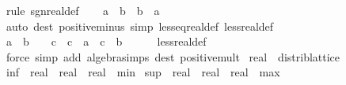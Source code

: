 \begin{isabellebody}
\ {\isacharparenleft}{\kern0pt}rule\ sgn{\isacharunderscore}{\kern0pt}real{\isacharunderscore}{\kern0pt}def{\isacharparenright}{\kern0pt}\isanewline
\ \ \isamarkupfalse%
\ {\isachardoublequoteopen}a\ {\isasymle}\ b\ {\isasymor}\ b\ {\isasymle}\ a{\isachardoublequoteclose}\isanewline
\ \ \ \ \isamarkupfalse%
\ {\isacharparenleft}{\kern0pt}auto\ dest{\isacharbang}{\kern0pt}{\isacharcolon}{\kern0pt}\ positive{\isacharunderscore}{\kern0pt}minus\ simp{\isacharcolon}{\kern0pt}\ less{\isacharunderscore}{\kern0pt}eq{\isacharunderscore}{\kern0pt}real{\isacharunderscore}{\kern0pt}def\ less{\isacharunderscore}{\kern0pt}real{\isacharunderscore}{\kern0pt}def{\isacharparenright}{\kern0pt}\isanewline
\ \ \isamarkupfalse%
\ {\isachardoublequoteopen}a\ {\isacharless}{\kern0pt}\ b\ {\isasymLongrightarrow}\ {}\ {\isacharless}{\kern0pt}\ c\ {\isasymLongrightarrow}\ c\ {\isacharasterisk}{\kern0pt}\ a\ {\isacharless}{\kern0pt}\ c\ {\isacharasterisk}{\kern0pt}\ b{\isachardoublequoteclose}\isanewline
\ \ \ \ \isamarkupfalse%
\ less{\isacharunderscore}{\kern0pt}real{\isacharunderscore}{\kern0pt}def\isanewline
\ \ \ \ \isamarkupfalse%
\ {\isacharparenleft}{\kern0pt}force\ simp\ add{\isacharcolon}{\kern0pt}\ algebra{\isacharunderscore}{\kern0pt}simps\ dest{\isacharcolon}{\kern0pt}\ positive{\isacharunderscore}{\kern0pt}mult{\isacharparenright}{\kern0pt}\isanewline
{}\isamarkupfalse%
%
\endisatagproof
{\isafoldproof}%
%
\isadelimproof
\isanewline
%
\endisadelimproof
\isanewline
{}\isamarkupfalse%
\isanewline
\isanewline
{}\isamarkupfalse%
\ real\ {\isacharcolon}{\kern0pt}{\isacharcolon}{\kern0pt}\ distrib{\isacharunderscore}{\kern0pt}lattice\isanewline
{}\isanewline
\isanewline
{}\isamarkupfalse%
\ {\isachardoublequoteopen}{\isacharparenleft}{\kern0pt}inf\ {\isacharcolon}{\kern0pt}{\isacharcolon}{\kern0pt}\ real\ {\isasymRightarrow}\ real\ {\isasymRightarrow}\ real{\isacharparenright}{\kern0pt}\ {\isacharequal}{\kern0pt}\ min{\isachardoublequoteclose}\isanewline
\isanewline
{}\isamarkupfalse%
\ {\isachardoublequoteopen}{\isacharparenleft}{\kern0pt}sup\ {\isacharcolon}{\kern0pt}{\isacharcolon}{\kern0pt}\ real\ {\isasymRightarrow}\ real\ {\isasymRightarrow}\ real{\isacharparenright}{\kern0pt}\ {\isacharequal}{\kern0pt}\ max{\isachardoublequoteclose}\isanewline
\isanewline
{}\isamarkupfalse%
\isanewline
%
\isadelimproof
\ \ %
\endisadelimproof
%
\isatagproof
{}\isamarkupfalse%

\end{isabellebody}
